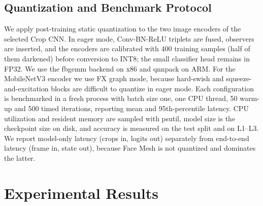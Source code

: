 \documentclass[conference]{IEEEtran}
\begin{document}
\subsection{Quantization and Benchmark Protocol}\label{sec:quantprotocol}
We apply post-training static quantization \cite{jacob2018,krishnamoorthi2018,rokh2023} to the two image encoders of the selected Crop CNN. In eager mode, Conv-BN-ReLU triplets are fused, observers are inserted, and the encoders are calibrated with 400 training samples (half of them darkened) before conversion to INT8; the small classifier head remains in FP32. We use the fbgemm backend on x86 and qnnpack on ARM. For the MobileNetV3 encoder we use FX graph mode, because hard-swish and squeeze-and-excitation blocks are difficult to quantize in eager mode.
Each configuration is benchmarked in a fresh process with batch size one, one CPU thread, 50 warm-up and 500 timed iterations, reporting mean and 95th-percentile latency. CPU utilization and resident memory are sampled with psutil, model size is the checkpoint size on disk, and accuracy is measured on the test split and on L1--L3. We report model-only latency (crops in, logits out) separately from end-to-end latency (frame in, state out), because Face Mesh is not quantized and dominates the latter.



\vspace{0.2cm}
\section{Experimental Results}
\end{document}
